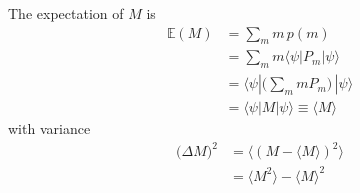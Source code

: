 \documentclass{article}
\begin{document}
  \begin{definition}
    The expectation of $M$ is
    \begin{align*}
      \mathbb{E}(M) & = \sum_m m\, p(m) \\
      & = \sum_m m \langle \psi | P_m | \psi \rangle \\
      & = \langle \psi | \bigg( \sum_m m P_m \bigg) \, | \psi \rangle \\
      & = \langle \psi | M | \psi \rangle \equiv \langle M \rangle
    \end{align*}
    with variance
    \begin{align*}
      \big( \Delta M\big)^2 & = \langle (M - \langle M \rangle )^2 \rangle \\
      & = \langle M^2 \rangle - \langle M \rangle^2
    \end{align*} 
  \end{definition}
\end{document}
